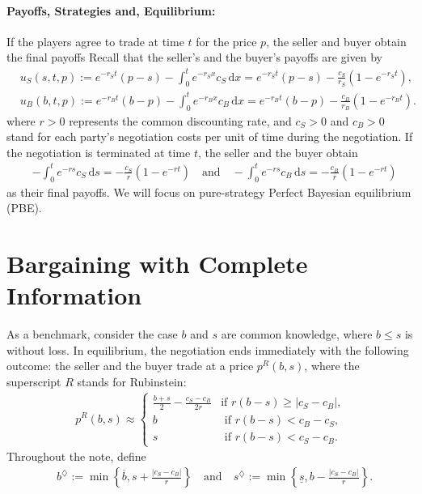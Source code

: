 \paragraph{Payoffs, Strategies and, Equilibrium:} 
If the players agree to trade at time $t$ for the price $p$,  the seller and buyer obtain the final payoffs 
    Recall that the seller's and the buyer's payoffs are given by 
    \begin{align}
    &u_S(s,t,p):=e^{-r_St}(p-s) - \int_0^t e^{-r_Sx} c_S \,\text{d}x
    =e^{-r_St}(p-s) - \frac{c_S}{r_S} (1-e^{-r_St}),\label{eq:utility_seller}
    \\
    &u_B(b,t,p):=e^{-r_Bt}(b-p) - \int_0^t e^{-r_Bx} c_B \,\text{d}x
    =e^{-r_Bt}(b-p) - \frac{c_B}{r_B} (1-e^{-r_Bt}).\label{eq:utility_buyer}
    \end{align}
where $r>0$ represents the common discounting rate, and $c_S>0$ and $c_B>0$ stand for each party's negotiation costs per unit of time during the negotiation. If the negotiation is terminated at time $t$, the seller and the buyer obtain 
    \begin{align*}
    &- \int_0^t e^{-rs} c_S \,\text{d}s = - \frac{c_S}{r} (1-e^{-rt})
    \quad\text{and}\quad- \int_0^t e^{-rs} c_B \,\text{d}s = - \frac{c_B}{r} (1-e^{-rt})
    \end{align*}
as their final payoffs. We will focus on pure-strategy Perfect Bayesian equilibrium (PBE). 

\section{Bargaining with Complete Information} \label{ss:complete_info}

As a benchmark, consider the case $b$ and $s$ are common knowledge, where $b\leq s$ is without loss. In equilibrium, the negotiation ends immediately with the following outcome: the seller and the buyer trade at a price $p^R(b,s)$, where the superscript $R$ stands for Rubinstein:
    \begin{align}\label{eq:rubinstine_price_00}
    p^R(b,s) \approx \left\{
    \begin{array}{cl}
    \frac{b+s}{2} - \frac{c_S-c_B}{2r} & \text{if $r(b-s)\geq|c_S-c_B|$,} 
    \\
    b  & \text{ if $r(b-s)< c_B-c_S$,}
    \\
    s & \text{ if $r(b-s)< c_S-c_B$.}
    \end{array}\right.
    \end{align}
Throughout the note, define 
    \begin{align*}
    &b^\diamondsuit :=\min\left\{\overline b, s+\frac{|c_S-c_B|}{r}\right\}
    \quad\text{and}\quad 
    s^\diamondsuit :=\min\left\{\underline s, b-\frac{|c_S-c_B|}{r}\right\}. 
    \end{align*}
    
